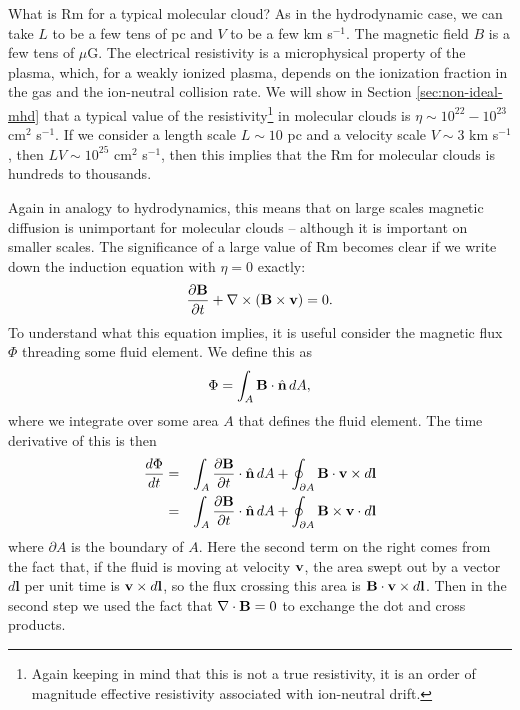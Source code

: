 What is Rm for a typical molecular cloud? As in the hydrodynamic case, we can take $L$ to be a few tens of pc and $V$ to be a few km s$^{-1}$. The magnetic field $B$ is a few tens of $\mu$G. The electrical resistivity is a microphysical property of the plasma, which, for a weakly ionized plasma, depends on the ionization fraction in the gas and the ion-neutral collision rate. We will show in Section \ref{sec:non-ideal-mhd} that a typical value of the resistivity\footnote{Again keeping in mind that this is not a true resistivity, it is an order of magnitude effective resistivity associated with ion-neutral drift.} in molecular clouds is $\eta\sim 10^{22}-10^{23}$ cm$^2$ s$^{-1}$. If we consider a length scale $L\sim 10$ pc and a velocity scale $V\sim 3$ km s$^{-1}$, then $LV\sim 10^{25}$ cm$^2$ s$^{-1}$, then this implies that the Rm for molecular clouds is hundreds to thousands.

Again in analogy to hydrodynamics, this means that on large scales magnetic diffusion is unimportant for molecular clouds -- although it is important on smaller scales. The significance of a large value of Rm becomes clear if we write down the induction equation with $\eta=0$ exactly:
\begin{equation}
\frac{\partial \mathbf{B}}{\partial t} + \nabla \times (\mathbf{B} \times \mathbf{v}) = 0.
\end{equation}
To understand what this equation implies, it is useful consider the magnetic flux $\Phi$ threading some fluid element. We define this as
\begin{equation}
\Phi = \int_A  \mathbf{B} \cdot \hat{\mathbf{n}}\, dA,
\end{equation}
where we integrate over some area $A$ that defines the fluid element. The time derivative of this is then
\begin{eqnarray}
\frac{d\Phi}{dt} & = & \int_A \frac{\partial\mathbf{B}}{\partial t}\cdot\hat{\mathbf{n}}\, dA + \oint_{\partial A} \mathbf{B}\cdot \mathbf{v} \times d\mathbf{l} \\
& = & \int_A \frac{\partial\mathbf{B}}{\partial t}\cdot\hat{\mathbf{n}}\, dA + \oint_{\partial A} \mathbf{B}\times \mathbf{v} \cdot d\mathbf{l}
\end{eqnarray}
where $\partial A$ is the boundary of $A$. Here the second term on the right comes from the fact that, if the fluid is moving at velocity $\mathbf{v}$, the area swept out by a vector $d\mathbf{l}$ per unit time is $\mathbf{v}\times d\mathbf{l}$, so the flux crossing this area is $\mathbf{B}\cdot \mathbf{v}\times d\mathbf{l}$. Then in the second step we used the fact that $\nabla\cdot \mathbf{B} = 0$ to exchange the dot and cross products.

